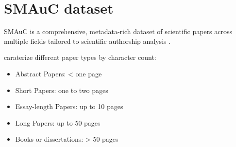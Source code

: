 \section{SMAuC dataset}
\label{sec:smauc_dataset}

SMAuC is a comprehensive, metadata-rich dataset of scientific papers across multiple fields tailored to scientific authorship analysis \citep{bevendorff_smauc_2023}.

\citet{bevendorff_smauc_2023} caraterize different paper types by character count:
\begin{itemize}
    \item Abstract Papers: < one page
    \item Short Papers: one to two pages
    \item Essay-length Papers: up to 10 pages
    \item Long Papers: up to 50 pages
    \item Books or dissertations: > 50 pages
\end{itemize}